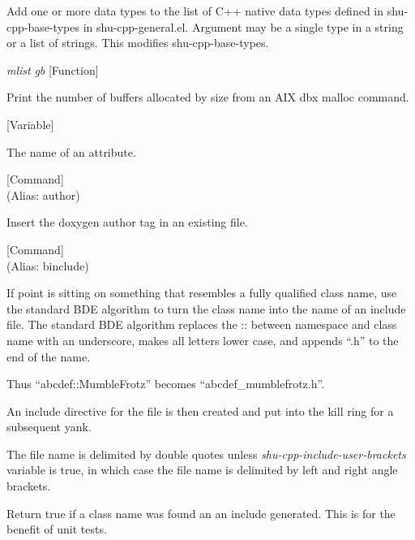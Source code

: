 \begin{doc-string}
Add one or more data types to the list of C++ native data types defined in shu-cpp-base-types
in shu-cpp-general.el.  Argument may be a single type in a string or a list of strings.
This modifies shu-cpp-base-types.
\end{doc-string}

\vspace{1em}
\noindent
{}
\usebox{\funcname}\emph{mlist} \emph{gb}
 \hfill [Function]

\begin{doc-string}
Print the number of buffers allocated by size from an AIX dbx malloc command.
\end{doc-string}

\vspace{1em}
\noindent
{}
\usebox{\funcname}
 \hfill [Variable]

\begin{doc-string}
The name of an attribute.
\end{doc-string}

\vspace{1em}
\noindent
{}
\usebox{\funcname}
 \hfill [Command]\\%
 (Alias: author)

\begin{doc-string}
Insert the doxygen author tag in an existing file.
\end{doc-string}

\vspace{1em}
\noindent
{}
\usebox{\funcname}
 \hfill [Command]\\%
 (Alias: binclude)

\begin{doc-string}
If point is sitting on something that resembles a fully qualified class name,
use the standard BDE algorithm to turn the class name into the name of an
include file.  The standard BDE algorithm replaces the :: between namespace and
class name with an underscore, makes all letters lower case, and appends ``.h''
to the end of the name.

Thus ``abcdef::MumbleFrotz'' becomes ``abcdef\_mumblefrotz.h''.

An include directive for the file is then created and put into the kill ring for
a subsequent yank.

The file name is delimited by double quotes unless \emph{shu-cpp-include-user-brackets}
variable is true, in which case the file name is delimited by left and right
angle brackets.

Return true if a class name was found an an include generated.  This is for the
benefit of unit tests.
\end{doc-string}

